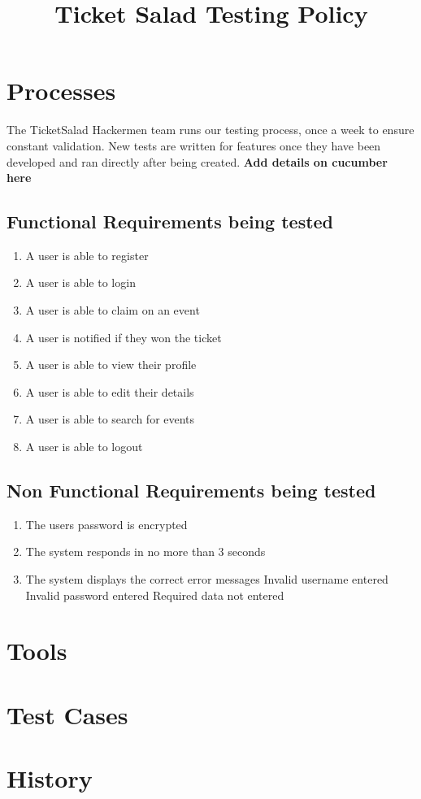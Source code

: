 \documentclass[11pt]{article}
\begin{document}
	\title{Ticket Salad Testing Policy}
	\date{}
	\maketitle
	\newpage
	\tableofcontents
	\newpage
	\section{Processes}
	The TicketSalad Hackermen team runs our testing process, once a week to ensure constant validation. New tests are written for features once they have been developed and ran directly after being created. 
	\newline \textbf{Add details on cucumber here}
	\subsection{Functional Requirements being tested}
	\begin{enumerate}
		\item A user is able to register
		\item A user is able to login
		\item A user is able to claim on an event
		\item A user is notified if they won the ticket
		\item A user is able to view their profile
		\item A user is able to edit their details
		\item A user is able to search for events
		\item A user is able to logout
	\end{enumerate}
	\subsection{Non Functional Requirements being tested}
	\begin{enumerate}
		\item The users password is encrypted
		\item The system responds in no more than 3 seconds
		\item The system displays the correct error messages
		\subitem Invalid username entered
		\subitem Invalid password entered
		\subitem Required data not entered
	\end{enumerate}
	\section{Tools}
	\section{Test Cases}
	\section{History}
\end{document}
